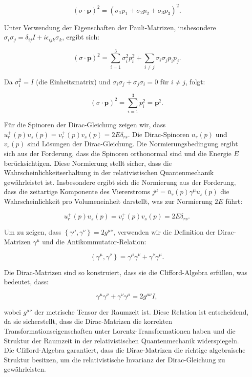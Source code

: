 \documentclass[11pt,a4paper]{article}
\begin{document}
\[
(\sigma \cdot \mathbf{p})^2 = (\sigma_1 p_1 + \sigma_2 p_2 + \sigma_3 p_3)^2.
\]

Unter Verwendung der Eigenschaften der Pauli-Matrizen, insbesondere $\sigma_i \sigma_j = \delta_{ij} I + i \epsilon_{ijk} \sigma_k$, ergibt sich:

\[
(\sigma \cdot \mathbf{p})^2 = \sum_{i=1}^{3} \sigma_i^2 p_i^2 + \sum_{i \neq j} \sigma_i \sigma_j p_i p_j.
\]

Da $\sigma_i^2 = I$ (die Einheitsmatrix) und $\sigma_i \sigma_j + \sigma_j \sigma_i = 0$ für $i \neq j$, folgt:

\[
(\sigma \cdot \mathbf{p})^2 = \sum_{i=1}^{3} p_i^2 = \mathbf{p}^2.
\]

Für die Spinoren der Dirac-Gleichung zeigen wir, dass $u_r^{+}(p) u_s(p) = v_r^{+}(p) v_s(p) = 2 E \delta_{rs}$. Die Dirac-Spinoren $u_r(p)$ und $v_r(p)$ sind Lösungen der Dirac-Gleichung. Die Normierungsbedingung ergibt sich aus der Forderung, dass die Spinoren orthonormal sind und die Energie $E$ berücksichtigen. Diese Normierung stellt sicher, dass die Wahrscheinlichkeitserhaltung in der relativistischen Quantenmechanik gewährleistet ist. Insbesondere ergibt sich die Normierung aus der Forderung, dass die zeitartige Komponente des Viererstroms $j^\mu = \bar{u}_r(p) \gamma^\mu u_s(p)$ die Wahrscheinlichkeit pro Volumeneinheit darstellt, was zur Normierung $2E$ führt:

\[
u_r^{+}(p) u_s(p) = v_r^{+}(p) v_s(p) = 2 E \delta_{rs}.
\]

Um zu zeigen, dass $\left\{\gamma^\mu, \gamma^\nu\right\} = 2 g^{\mu \nu}$, verwenden wir die Definition der Dirac-Matrizen $\gamma^\mu$ und die Antikommutator-Relation:

\[
\left\{\gamma^\mu, \gamma^\nu\right\} = \gamma^\mu \gamma^\nu + \gamma^\nu \gamma^\mu.
\]

Die Dirac-Matrizen sind so konstruiert, dass sie die Clifford-Algebra erfüllen, was bedeutet, dass:

\[
\gamma^\mu \gamma^\nu + \gamma^\nu \gamma^\mu = 2 g^{\mu \nu} I,
\]

wobei $g^{\mu \nu}$ der metrische Tensor der Raumzeit ist. Diese Relation ist entscheidend, da sie sicherstellt, dass die Dirac-Matrizen die korrekten Transformationseigenschaften unter Lorentz-Transformationen haben und die Struktur der Raumzeit in der relativistischen Quantenmechanik widerspiegeln. Die Clifford-Algebra garantiert, dass die Dirac-Matrizen die richtige algebraische Struktur besitzen, um die relativistische Invarianz der Dirac-Gleichung zu gewährleisten.
\end{document}
